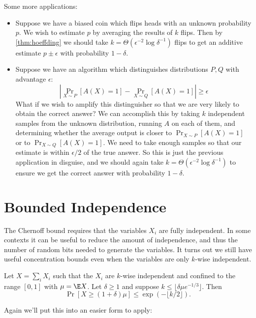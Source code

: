 \documentclass[11pt,a4paper]{article}
\begin{document}
Some more applications:

\begin{itemize}
\item
  Suppose we have a biased coin which flips heads with an unknown probability $p$.
  We wish to estimate $p$ by averaging the results of $k$ flips.
  Then by \cref{thm:hoeffding} we should take $k = \Theta(\epsilon^{-2} \log \delta^{-1})$ flips
  to get an additive estimate $p \pm \epsilon$ with probability $1 - \delta$.
\item
  Suppose we have an algorithm which distinguishes distributions $P, Q$ with advantage $\epsilon$:
  \[
  \left|\Pr_{X \sim P}[A(X) = 1] - \Pr_{X \sim Q}[A(X) = 1]\right| \ge \epsilon
  \]
  What if we wish to amplify this distinguisher so that we are very likely to obtain the correct answer?
  We can accomplish this by taking $k$ independent samples from the unknown distribution,
  running $A$ on each of them, and determining whether the average output is closer to $\Pr_{X \sim P}[A(X) = 1]$ or to $\Pr_{X \sim Q}[A(X) = 1]$.
  We need to take enough samples so that our estimate is within $\epsilon/2$ of the true answer.
  So this is just the previous application in disguise, and we should again take $k = \Theta(\epsilon^{-2} \log \delta^{-1})$
  to ensure we get the correct answer with probability $1 - \delta$.
\end{itemize}

\section{Bounded Independence}

The Chernoff bound requires that the variables \(X_i\) are fully independent.
In some contexts it can be useful to reduce the amount of independence, and thus the number of random bits needed to generate the variables.
It turns out we still have useful concentration bounds even when the variables are only \(k\)-wise independent.

\begin{theorem}
  \label{thm:limited-chernoff}
  Let \(X = \sum_i X_i\) such that the \(X_i\) are \(k\)-wise independent and confined to the range \([0, 1]\) with \(\mu = \E X\).
  Let \(\delta \ge 1\) and suppose \(k \le \lfloor \delta \mu e^{-1/3} \rfloor.\)
  Then \[\Pr[X \ge (1 + \delta)\mu] \le \exp(-\lfloor k/2 \rfloor).\]
\end{theorem}

Again we'll put this into an easier form to apply:
\end{document}
